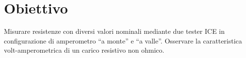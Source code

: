 \section{Obiettivo}


Misurare resistenze con diversi valori nominali mediante due tester ICE in configurazione di amperometro ``a monte'' e ``a valle''. Osservare la caratteristica volt-amperometrica di un carico resistivo non ohmico.